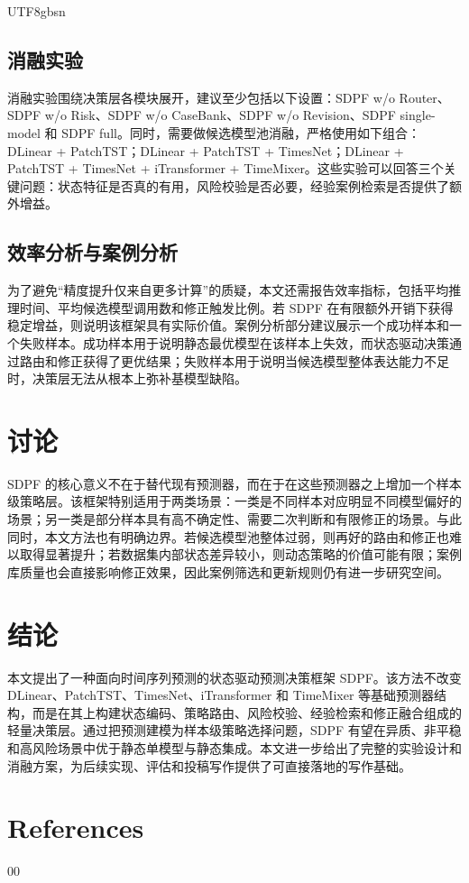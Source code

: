 \documentclass[journal,twoside,web]{ieeecolor}
\begin{document}
\begin{CJK*}{UTF8}{gbsn}
\subsection{消融实验}
消融实验围绕决策层各模块展开，建议至少包括以下设置：SDPF w/o Router、SDPF w/o Risk、SDPF w/o CaseBank、SDPF w/o Revision、SDPF single-model 和 SDPF full。同时，需要做候选模型池消融，严格使用如下组合：DLinear + PatchTST；DLinear + PatchTST + TimesNet；DLinear + PatchTST + TimesNet + iTransformer + TimeMixer。这些实验可以回答三个关键问题：状态特征是否真的有用，风险校验是否必要，经验案例检索是否提供了额外增益。

\subsection{效率分析与案例分析}
为了避免“精度提升仅来自更多计算”的质疑，本文还需报告效率指标，包括平均推理时间、平均候选模型调用数和修正触发比例。若 SDPF 在有限额外开销下获得稳定增益，则说明该框架具有实际价值。案例分析部分建议展示一个成功样本和一个失败样本。成功样本用于说明静态最优模型在该样本上失效，而状态驱动决策通过路由和修正获得了更优结果；失败样本用于说明当候选模型整体表达能力不足时，决策层无法从根本上弥补基模型缺陷。

\section{讨论}
SDPF 的核心意义不在于替代现有预测器，而在于在这些预测器之上增加一个样本级策略层。该框架特别适用于两类场景：一类是不同样本对应明显不同模型偏好的场景；另一类是部分样本具有高不确定性、需要二次判断和有限修正的场景。与此同时，本文方法也有明确边界。若候选模型池整体过弱，则再好的路由和修正也难以取得显著提升；若数据集内部状态差异较小，则动态策略的价值可能有限；案例库质量也会直接影响修正效果，因此案例筛选和更新规则仍有进一步研究空间。

\section{结论}
本文提出了一种面向时间序列预测的状态驱动预测决策框架 SDPF。该方法不改变 DLinear、PatchTST、TimesNet、iTransformer 和 TimeMixer 等基础预测器结构，而是在其上构建状态编码、策略路由、风险校验、经验检索和修正融合组成的轻量决策层。通过把预测建模为样本级策略选择问题，SDPF 有望在异质、非平稳和高风险场景中优于静态单模型与静态集成。本文进一步给出了完整的实验设计和消融方案，为后续实现、评估和投稿写作提供了可直接落地的写作基础。

\section*{References}
\begin{thebibliography}{00}


\end{thebibliography}
\end{CJK*}
\end{document}
